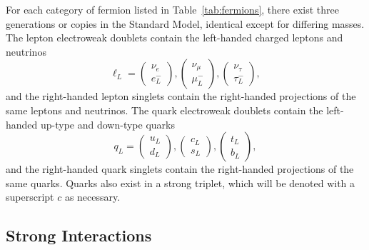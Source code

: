 For each category of fermion listed in Table~\ref{tab:fermions}, there exist three generations or copies in the Standard Model, identical except for differing masses.
The lepton electroweak doublets contain the left-handed charged leptons and neutrinos
\begin{equation}
  \ell_{L} = \begin{pmatrix} \nu_e \\ e^-_L \end{pmatrix} ,
              \begin{pmatrix} \nu_\mu \\ \mu^-_L \end{pmatrix} ,
              \begin{pmatrix} \nu_\tau \\ \tau^-_L \end{pmatrix} ,
\end{equation}
and the right-handed lepton singlets contain the right-handed projections of the same leptons and neutrinos.
The quark electroweak doublets contain the left-handed up-type and down-type quarks
\begin{equation}
  q_{L} = \begin{pmatrix} u_L \\ d_L \end{pmatrix} ,
           \begin{pmatrix} c_L \\ s_L \end{pmatrix} ,
           \begin{pmatrix} t_L \\ b_L \end{pmatrix} ,
\end{equation}
and the right-handed quark singlets contain the right-handed projections of the same quarks.
Quarks also exist in a strong triplet, which will be denoted with a superscript $c$ as necessary.

\subsection{Strong Interactions}
\label{subsec:qcd}

